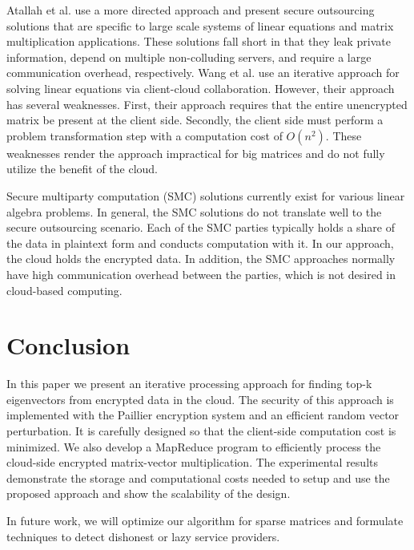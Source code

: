 \documentclass[10pt, conference, compsocconf]{IEEEtran}
\begin{document}
Atallah et al. \cite{atallah10} use a more directed approach and present secure outsourcing solutions that are specific to large scale systems of linear equations and matrix multiplication applications.  These solutions fall short in that they leak private information, depend on multiple non-colluding servers, and require a large communication overhead, respectively.  Wang et al. \cite{wang11} use an iterative approach for solving linear equations via client-cloud collaboration.  However, their approach has several  weaknesses.  First, their approach requires that the entire unencrypted matrix be present at the client side.  Secondly, the client side must perform a problem transformation step with a computation cost of $O(n^2)$.  These weaknesses render the approach impractical for big matrices and do not fully utilize the benefit of the cloud.  

Secure multiparty computation (SMC) solutions \cite{nissim06, cramer01, kiltz07} currently exist for various linear algebra problems.  In general, the SMC solutions do not translate well to the secure outsourcing scenario. Each of the SMC parties typically holds a share of the data in plaintext form and conducts computation with it. In our approach, the cloud holds the encrypted data. In addition, the SMC approaches normally have high communication overhead between the parties, which is not desired in cloud-based computing.



\section{Conclusion}\label{sec:conclusion}
In this paper we present an iterative processing approach for finding top-k eigenvectors from encrypted data in the cloud. The security of this approach is implemented with the Paillier encryption system and an efficient random vector perturbation. It is carefully designed so that the client-side computation cost is minimized. We also develop a MapReduce program to efficiently process the cloud-side encrypted matrix-vector multiplication. The experimental results demonstrate the storage and computational costs needed to setup and use the proposed approach and show the scalability of the design. 

In future work, we will optimize our algorithm for sparse matrices and formulate techniques to detect dishonest or lazy service providers.




 
\end{document}

